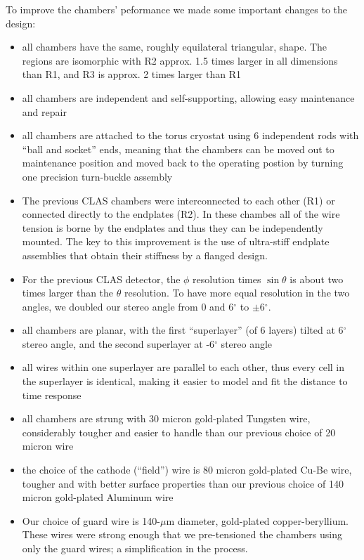 To improve the chambers' peformance we made some important changes to the design:
\begin{itemize}
\item all chambers have the same, roughly equilateral triangular, shape.
The regions are isomorphic with R2 approx. 1.5 times larger
in all dimensions than R1, and R3 is approx. 2 times larger than R1
\item all chambers are independent and self-supporting, allowing easy
maintenance and repair
\item all chambers are attached to the torus cryostat using 6 independent
rods with ``ball and socket'' ends, meaning that the chambers can be
moved out to maintenance position and moved back to the operating 
postion by turning one precision turn-buckle assembly
\item The previous CLAS chambers were interconnected to each other (R1) or 
connected directly to the endplates (R2).  In these chambes all of the wire tension
is borne by the endplates and thus they can be independently mounted.
The key to this improvement is the use of  
ultra-stiff endplate assemblies that obtain their stiffness 
by a flanged design.  
\item For the previous CLAS detector, the $\phi$ resolution times $\sin \theta$ is about two 
times larger than the $\theta$ resolution.  To have more equal resolution in 
the two angles, we doubled our stereo angle from 0 and 6$^\circ$ to 
$\pm$6$^\circ$.
\item all chambers are planar, with the first ``superlayer'' (of 6 layers)
tilted at 6$^\circ$ stereo angle, and the second superlayer at -6$^\circ$ stereo
angle
\item all wires within one superlayer are parallel to each other, thus
every cell in the superlayer is identical, making it easier to model
and fit the distance to time response
\item all chambers are strung with 30 micron gold-plated Tungsten wire,
considerably tougher and easier to handle than our previous choice 
of 20 micron wire
\item the choice of the cathode (``field'') wire is 80 micron gold-plated
Cu-Be wire, tougher and with better surface properties than our previous
choice of 140 micron gold-plated Aluminum wire
\item  Our choice of guard wire is 140-$\mu$m diameter, gold-plated
copper-beryllium.  These wires were strong enough that we pre-tensioned 
the chambers using only the guard wires; a simplification in the process.

\end{itemize}

